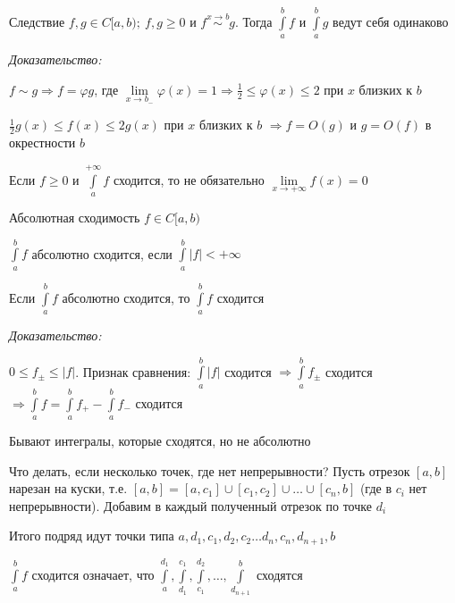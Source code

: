 \documentclass[12pt]{article}
\begin{document}
\begin{theo}{Следствие}
    $f, g \in C[a, b);\ f, g \geq 0$ и $f \stackrel{x \to b}{\sim} g$. Тогда $\int\limits_a^b f$ и $\int\limits_a^b g$ ведут себя одинаково
\end{theo}

\textit{Доказательство:}

$f \sim g \Rightarrow f = \varphi g$, где $\lim\limits_{x \to b_-} \varphi(x) = 1 \Rightarrow \frac{1}{2} \leq \varphi(x) \leq 2$ при $x$ близких к $b$

$\frac{1}{2}g(x) \leq f(x) \leq 2g(x)$ при $x$ близких к $b$ $\Rightarrow f = O(g)$ и $g = O(f)$ в окрестности $b$

\begin{Remark}{}
    Если $f \geq 0$ и $\int\limits_a^{+ \infty} f$ сходится, то не обязательно $\lim\limits_{x \to + \infty} f(x) = 0$
\end{Remark}

\begin{defin}{Абсолютная сходимость}
    $f \in C[a, b)$

    $\int\limits_a^b f$ абсолютно сходится, если $\int\limits_a^b |f| < + \infty$
\end{defin}

\begin{theo}{}
    Если $\int\limits_a^b f$ абсолютно сходится, то $\int\limits_a^b f$ сходится
\end{theo}

\textit{Доказательство:}

$0 \leq f_\pm \leq |f|$. Признак сравнения: $\int\limits_a^b |f|$ сходится $\Rightarrow \int\limits_a^b f_\pm$ сходится $\Rightarrow \int\limits_a^b f = \int\limits_a^b f_+ - \int\limits_a^b f_-$ сходится

\begin{Remark}{}
    Бывают интегралы, которые сходятся, но не абсолютно
\end{Remark}

\begin{Exercise}{}
    Что делать, если несколько точек, где нет непрерывности? Пусть отрезок $[a, b]$ нарезан на куски, т.е. $[a, b] = [a, c_1] \cup [c_1, c_2] \cup \ldots \cup [c_n, b]$ (где в $c_i$ нет непрерывности). Добавим в каждый полученный отрезок по точке $d_i$

    Итого подряд идут точки типа $a, d_1, c_1, d_2, c_2 \ldots d_n, c_n, d_{n + 1}, b$

    $\int\limits_a^b f$ сходится означает, что $\int\limits_a^{d_1}, \int\limits_{d_1}^{c_1}, \int\limits_{c_1}^{d_2}, \ldots, \int\limits_{d_{n + 1}}^b$ сходятся
\end{Exercise}
\end{document}
